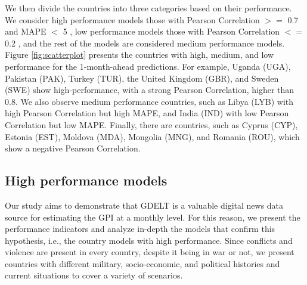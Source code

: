 \documentclass{bmcart}
\begin{document}
We then divide the countries into three categories based on their performance. We consider high performance models those with Pearson Correlation $>=$ 0.7 and MAPE $<$ 5 \cite{swanson2015relationship, akoglu2018user}, low performance models those with Pearson Correlation $<=$ 0.2 \cite{akoglu2018user}, and the rest of the models are considered medium performance models. 
Figure \ref{fig:scatterplot} presents the countries with high, medium, and low performance for the 1-month-ahead predictions. 
For example, Uganda (UGA), Pakistan (PAK), Turkey (TUR), the United Kingdom (GBR), and Sweden (SWE) show high-performance, with a strong Pearson Correlation, higher than 0.8. 
We also observe medium performance countries, such as Libya (LYB) with high Pearson Correlation but high MAPE, and India (IND) with low Pearson Correlation but low MAPE. 
Finally, there are countries, such as Cyprus (CYP), Estonia (EST), Moldova (MDA), Mongolia (MNG), and Romania (ROU), which show a negative Pearson Correlation.

\subsection{High performance models}
\label{section:predicting_gpi}

Our study aims to demonstrate that GDELT is a valuable digital news data source for estimating the GPI at a monthly level. 
For this reason, we present the performance indicators and analyze in-depth the models that confirm this hypothesis, i.e., the country models with high performance. 
Since conflicts and violence are present in every country, despite it being in war or not, we present countries with different military, socio-economic, and political histories and current situations to cover a variety of scenarios. 
\end{document}
